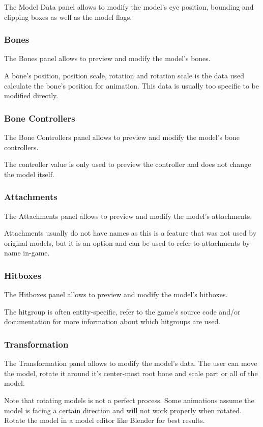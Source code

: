 \documentclass[10pt, a4paper, titlepage, oneside]{article}
\begin{document}
The Model Data panel allows to modify the model's eye position, bounding and clipping boxes as well as the model flags.

\subsubsection{Bones}

The Bones panel allows to preview and modify the model's bones.

\vspace{\baselineskip}
A bone's position, position scale, rotation and rotation scale is the data used calculate the bone's position for animation. This data is usually too specific to be modified directly.

\subsubsection{Bone Controllers}

The Bone Controllers panel allows to preview and modify the model's bone controllers.

\vspace{\baselineskip}
The controller value is only used to preview the controller and does not change the model itself.

\subsubsection{Attachments}

The Attachments panel allows to preview and modify the model's attachments.

\vspace{\baselineskip}
Attachments usually do not have names as this is a feature that was not used by original models, but it is an option and can be used to refer to attachments by name in-game.

\subsubsection{Hitboxes}

The Hitboxes panel allows to preview and modify the model's hitboxes.

\vspace{\baselineskip}
The hitgroup is often entity-specific, refer to the game's source code and/or documentation for more information about which hitgroups are used.

\subsubsection{Transformation}

The Transformation panel allows to modify the model's data. The user can move the model, rotate it around it's center-most root bone and scale part or all of the model.

\vspace{\baselineskip}
Note that rotating models is not a perfect process. Some animations assume the model is facing a certain direction and will not work properly when rotated. Rotate the model in a model editor like Blender for best results.

\setlength{\parindent}{15pt}
\end{document}
